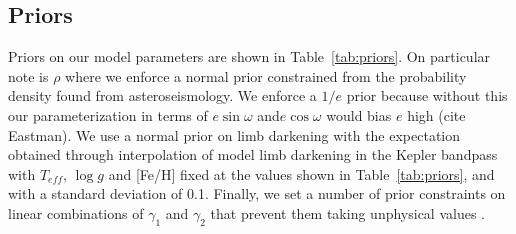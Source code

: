 \documentclass[apjl]{emulateapj}
\begin{document}






\subsection{Priors}
Priors on our model parameters are shown in Table~\ref{tab:priors}. On particular note is $\rho$ where we enforce a normal prior constrained from the probability density found from asteroseismology. We enforce a $1/e$ prior because without this our parameterization in terms of $e\sin{\omega}$ and$e\cos{\omega}$ would bias $e$ high (cite Eastman). We use a normal prior on limb darkening with the expectation obtained through interpolation of model limb darkening in the Kepler bandpass with $T_{eff}$, $\log{g}$ and [Fe/H] fixed at the values shown in Table~\ref{tab:priors}, and with a standard deviation of 0.1. Finally, we set a number of prior constraints on linear combinations of $\gamma_1$ and $\gamma_2$ that prevent them taking unphysical values \citep{burke08}.
\end{document}
